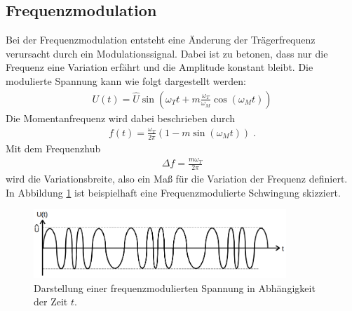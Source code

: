 \subsection{Frequenzmodulation}
\label{sec:Frequenzmodulation}
Bei der Frequenzmodulation entsteht eine Änderung der Trägerfrequenz verursacht durch ein Modulationssignal. Dabei ist zu betonen, dass nur die Frequenz eine Variation erfährt und die Amplitude konstant bleibt. Die modulierte Spannung kann wie folgt dargestellt werden:
\begin{align}
	U(t)=\hat{U}\sin{\left(\omega_Tt+m\frac{\omega_T}{\omega_M}\cos{(\omega_Mt)}\right)}
	\label{eq:2}
\end{align}
Die Momentanfrequenz wird dabei beschrieben durch
\begin{align}
	f(t)=\frac{\omega_T}{2\pi}(1-m\sin{(\omega_Mt)})\;.
\end{align}
Mit dem Frequenzhub
\begin{align}
	\Delta f=\frac{m\omega_T}{2\pi}
\end{align}
wird die Variationsbreite, also ein Maß für die Variation der Frequenz definiert. In Abbildung \ref{fig_T3} ist beispielhaft eine Frequenzmodulierte Schwingung skizziert.

\begin{figure}
    \centering
    \includegraphics[width=0.85\textwidth]{ressources/T3.png}
    \caption{Darstellung einer frequenzmodulierten Spannung in Abhängigkeit der Zeit $t$\cite{skript}.}
    \label{fig_T3}
\end{figure}

